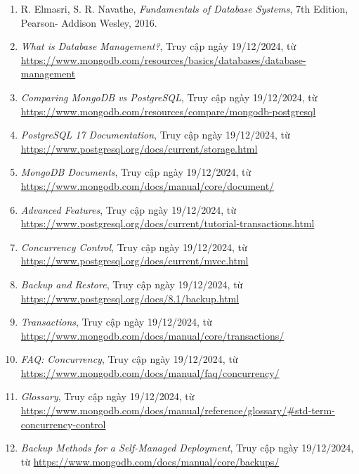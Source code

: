 \begin{enumerate}
    \item  R. Elmasri, S. R. Navathe, \textit{Fundamentals of Database Systems}, 7th Edition, Pearson- Addison Wesley, 2016.
    \item \textit{What is Database Management?}, Truy cập ngày 19/12/2024, từ \url{https://www.mongodb.com/resources/basics/databases/database-management}
    \item \textit{Comparing MongoDB vs PostgreSQL}, Truy cập ngày 19/12/2024, từ \url{https://www.mongodb.com/resources/compare/mongodb-postgresql}
    \item \textit{PostgreSQL 17 Documentation}, Truy cập ngày 19/12/2024, từ \url{https://www.postgresql.org/docs/current/storage.html}
    \item \textit{MongoDB Documents}, Truy cập ngày 19/12/2024, từ \url{https://www.mongodb.com/docs/manual/core/document/}
    \item \textit{Advanced Features}, Truy cập ngày 19/12/2024, từ \url{https://www.postgresql.org/docs/current/tutorial-transactions.html}
    \item \textit{Concurrency Control}, Truy cập ngày 19/12/2024, từ
    \url{https://www.postgresql.org/docs/current/mvcc.html}
    \item \textit{Backup and Restore}, Truy cập ngày 19/12/2024, từ \url{https://www.postgresql.org/docs/8.1/backup.html}
    \item \textit{Transactions}, Truy cập ngày 19/12/2024, từ \url{https://www.mongodb.com/docs/manual/core/transactions/}
    \item \textit{FAQ: Concurrency}, Truy cập ngày 19/12/2024, từ \url{https://www.mongodb.com/docs/manual/faq/concurrency/}
    \item \textit{Glossary}, Truy cập ngày 19/12/2024, từ \url{https://www.mongodb.com/docs/manual/reference/glossary/#std-term-concurrency-control}
    \item \textit{Backup Methods for a Self-Managed Deployment}, Truy cập ngày 19/12/2024, từ \url{https://www.mongodb.com/docs/manual/core/backups/}
\end{enumerate}
